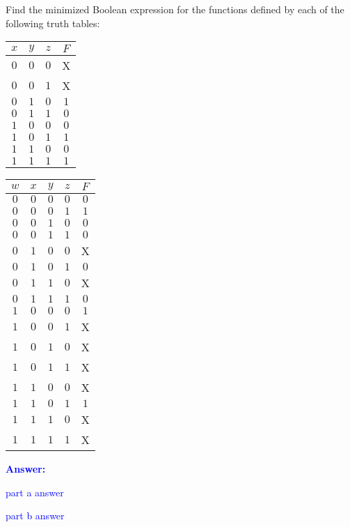 \item{}
Find the minimized Boolean expression for the functions defined by each of the
following truth tables:
\begin{list}{\textbf{}}{}
    \item \begin{tabular}{ccc|c}
    \hline
    {\bf $x$} & {\bf $y$} & {\bf $z$} & {\bf $F$}\\ \hline\hline
    $0$ & $0$ & $0$ & X \\ \hline
    $0$ & $0$ & $1$ & X \\ \hline
    $0$ & $1$ & $0$ & $1$ \\ \hline
    $0$ & $1$ & $1$ & $0$ \\ \hline
    $1$ & $0$ & $0$ & $0$ \\ \hline
    $1$ & $0$ & $1$ & $1$ \\ \hline
    $1$ & $1$ & $0$ & $0$ \\ \hline
    $1$ & $1$ & $1$ & $1$ \\ \hline
\end{tabular}
    \item \begin{tabular}{cccc|c}
        \hline
        {\bf $w$} & {\bf $x$} & {\bf $y$} & {\bf $z$} & {\bf $F$}\\ \hline\hline
        $0$ & $0$ & $0$ & $0$ & $0$ \\ \hline
        $0$ & $0$ & $0$ & $1$ & $1$ \\ \hline
        $0$ & $0$ & $1$ & $0$ & $0$ \\ \hline
        $0$ & $0$ & $1$ & $1$ & $0$ \\ \hline
        $0$ & $1$ & $0$ & $0$ & X \\ \hline
        $0$ & $1$ & $0$ & $1$ & $0$ \\ \hline
        $0$ & $1$ & $1$ & $0$ & X \\ \hline
        $0$ & $1$ & $1$ & $1$ & $0$ \\ \hline
        $1$ & $0$ & $0$ & $0$ & $1$ \\ \hline
        $1$ & $0$ & $0$ & $1$ & X \\ \hline
        $1$ & $0$ & $1$ & $0$ & X \\ \hline
        $1$ & $0$ & $1$ & $1$ & X \\ \hline
        $1$ & $1$ & $0$ & $0$ & X \\ \hline
        $1$ & $1$ & $0$ & $1$ & $1$ \\ \hline
        $1$ & $1$ & $1$ & $0$ & X \\ \hline
        $1$ & $1$ & $1$ & $1$ & X \\ \hline
    \end{tabular}
\end{list}
\vskip12pt
\ifanswers
\textcolor{blue}{
\textbf{Answer:}\\
\begin{list}{\textbf{}}{}
    \item part a answer
    \item part b answer
\end{list}
}
\newpage
\fi
